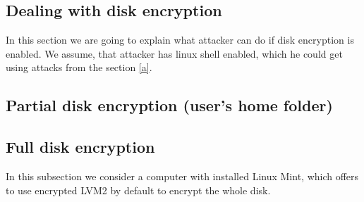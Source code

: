\subsection{Dealing with disk encryption}
In this section we are going to explain what attacker can do if disk encryption is enabled. We assume, that attacker has linux shell enabled, which he could get using attacks from the section \ref{a}.

\subsection{Partial disk encryption (user's home folder)}



\subsection{Full disk encryption}\label{fde}
In this subsection we consider a computer with installed Linux Mint, which offers to use encrypted LVM2 by default to encrypt the whole disk.

